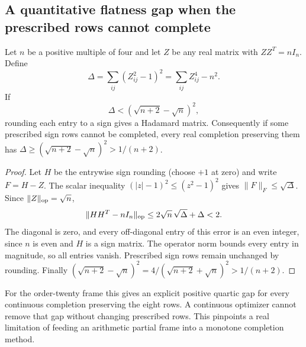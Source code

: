 \subsection{A quantitative flatness gap when the prescribed rows cannot complete}
\begin{proposition}
\label{dil:flatness-gap}
Let $n$ be a positive multiple of four and let $Z$ be any real matrix
with $ZZ^T=nI_n$. Define
\[
 \Delta=\sum_{ij}(Z_{ij}^2-1)^2=\sum_{ij}Z_{ij}^4-n^2.
\]
If
\[
 \Delta<(\sqrt{n+2}-\sqrt n)^2,
\]
rounding each entry to a sign gives a Hadamard matrix.
Consequently if some prescribed sign rows cannot be completed,
every real completion preserving them has
$\Delta\ge(\sqrt{n+2}-\sqrt n)^2>1/(n+2)$.
\end{proposition}
\begin{proof}
Let $H$ be the entrywise sign rounding (choose $+1$ at zero)
and write $F=H-Z$. The scalar inequality
$(|z|-1)^2\le(z^2-1)^2$ gives $\|F\|_F\le\sqrt\Delta$.
Since $\|Z\|_{\rm op}=\sqrt n$,
\[
 \|HH^T-nI_n\|_{\rm op}
 \le2\sqrt n\,\sqrt\Delta+\Delta<2.
\]
The diagonal is zero, and every off-diagonal entry of this error
is an even integer, since $n$ is even and $H$ is a sign matrix.
The operator norm bounds every entry in magnitude, so all entries
vanish. Prescribed sign rows remain unchanged by rounding.
Finally
$(\sqrt{n+2}-\sqrt n)^2
=4/(\sqrt{n+2}+\sqrt n)^2>1/(n+2)$.
\end{proof}

For the order-twenty frame this gives an explicit positive quartic
gap for every continuous completion preserving the eight rows.
A continuous optimizer cannot remove that gap without changing
prescribed rows. This pinpoints a real limitation of feeding an
arithmetic partial frame into a monotone completion method.
